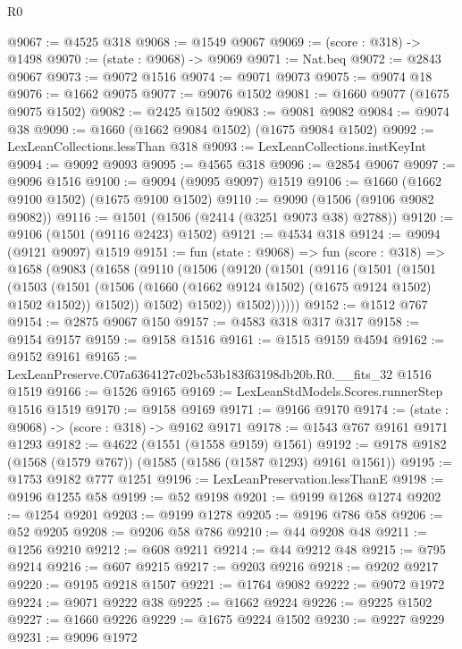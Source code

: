 \begin{lexlean}{R0}
\begin{coremodule}
@9067 := @4525 @318
@9068 := @1549 @9067
@9069 := (score : @318) -> @1498
@9070 := (state : @9068) -> @9069
@9071 := Nat.beq
@9072 := @2843 @9067
@9073 := @9072 @1516
@9074 := @9071 @9073
@9075 := @9074 @18
@9076 := @1662 @9075
@9077 := @9076 @1502
@9081 := @1660 @9077 (@1675 @9075 @1502)
@9082 := @2425 @1502
@9083 := @9081 @9082
@9084 := @9074 @38
@9090 := @1660 (@1662 @9084 @1502) (@1675 @9084 @1502)
@9092 := LexLeanCollections.lessThan @318
@9093 := LexLeanCollections.instKeyInt
@9094 := @9092 @9093
@9095 := @4565 @318
@9096 := @2854 @9067
@9097 := @9096 @1516
@9100 := @9094 (@9095 @9097) @1519
@9106 := @1660 (@1662 @9100 @1502) (@1675 @9100 @1502)
@9110 := @9090 (@1506 (@9106 @9082 @9082))
@9116 := @1501 (@1506 (@2414 (@3251 @9073 @38) @2788))
@9120 := @9106 (@1501 (@9116 @2423) @1502)
@9121 := @4534 @318
@9124 := @9094 (@9121 @9097) @1519
@9151 := fun (state : @9068) =>
  fun (score : @318) =>
  @1658
    (@9083
      (@1658
        (@9110
          (@1506
            (@9120
              (@1501
                (@9116
                  (@1501
                    (@1501
                      (@1503
                        (@1501
                          (@1506 (@1660 (@1662 @9124 @1502) (@1675 @9124 @1502) @1502 @1502))
                          @1502))
                      @1502)
                    @1502))
                @1502))))))
@9152 := @1512 @767
@9154 := @2875 @9067 @150
@9157 := @4583 @318 @317 @317
@9158 := @9154 @9157
@9159 := @9158 @1516
@9161 := @1515 @9159 @4594
@9162 := @9152 @9161
@9165 := LexLeanPreserve.C07a6364127c02bc53b183f63198db20b.R0.__fits_32 @1516 @1519
@9166 := @1526 @9165
@9169 := LexLeanStdModels.Scores.runnerStep @1516 @1519
@9170 := @9158 @9169
@9171 := @9166 @9170
@9174 := (state : @9068) -> (score : @318) -> @9162 @9171
@9178 := @1543 @767 @9161 @9171 @1293
@9182 := @4622 (@1551 (@1558 @9159) @1561)
@9192 := @9178 @9182 (@1568 (@1579 @767)) (@1585 (@1586 (@1587 @1293) @9161 @1561))
@9195 := @1753 @9182 @777 @1251
@9196 := LexLeanPreservation.lessThanE
@9198 := @9196 @1255 @58
@9199 := @52 @9198
@9201 := @9199 @1268 @1274
@9202 := @1254 @9201
@9203 := @9199 @1278
@9205 := @9196 @786 @58
@9206 := @52 @9205
@9208 := @9206 @58 @786
@9210 := @44 @9208 @48
@9211 := @1256 @9210
@9212 := @608 @9211
@9214 := @44 @9212 @48
@9215 := @795 @9214
@9216 := @607 @9215
@9217 := @9203 @9216
@9218 := @9202 @9217
@9220 := @9195 @9218 @1507
@9221 := @1764 @9082
@9222 := @9072 @1972
@9224 := @9071 @9222 @38
@9225 := @1662 @9224
@9226 := @9225 @1502
@9227 := @1660 @9226
@9229 := @1675 @9224 @1502
@9230 := @9227 @9229
@9231 := @9096 @1972

\end{coremodule}
\end{lexlean}
